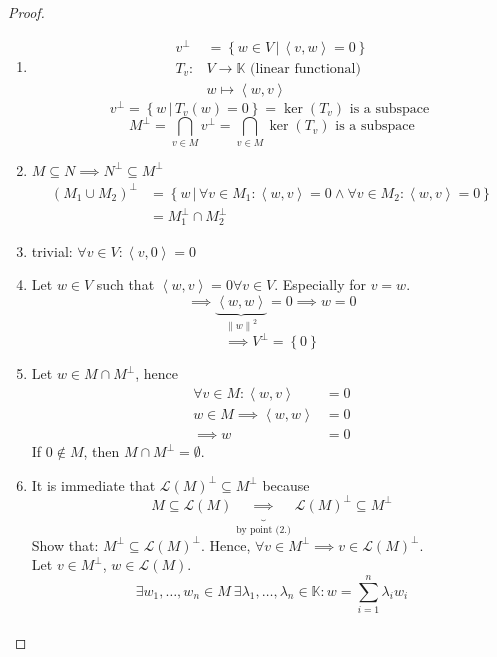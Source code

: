\documentclass[a4paper]{article}
\numberwithin{lecref}{section}
\newcommand{\set}[1]{\left\{#1\right\}}
\newcommand{\setdef}[2]{\left\{\left.#1\,\right|\,#2\right\}}
\newcommand{\ip}[2]{\left\langle#1,#2\right\rangle} %
\newcommand{\norm}[1]{\left\|#1\right\|}
\begin{document}
\begin{proof}
  \begin{enumerate}
    \item
      \begin{align*}
        v^\bot &= \setdef{w \in V}{\ip vw = 0} \\
          T_v: & V \to \mathbb K \text{ (linear functional)} \\
               & w \mapsto \ip wv
      \end{align*}
      \[ v^\bot = \setdef{w}{T_v(w) = 0} = \ker(T_v) \text{ is a subspace } \]
      \[ M^\bot = \bigcap_{v \in M} v^\bot = \bigcap_{v \in M} \ker(T_v) \text{ is a subspace} \]
    \item
      $M \subseteq N \implies N^\bot \subseteq M^\bot$
      \begin{align*}
        (M_1 \cup M_2)^\bot
          &= \setdef{w}{\forall v \in M_1: \ip wv = 0 \land \forall v \in M_2: \ip wv = 0} \\
          &= M_1^\bot \cap M_2^\bot
      \end{align*}
    \item trivial: $\forall v \in V: \ip v0 = 0$
    \item Let $w \in V$ such that $\ip wv = 0 \forall v \in V$. Especially for $v = w$.
      \[ \implies \underbrace{\ip ww}_{\norm{w}^2} = 0 \implies w = 0 \]
      \[ \implies V^\bot = \set{0} \]
    \item
      Let $w \in M \cap M^\bot$, hence
      \begin{align*}
        \forall v \in M: \ip wv &= 0 \\
        w \in M \implies \ip ww &= 0 \\
        \implies w &= 0
      \end{align*}
      If $0 \not\in M$, then $M \cap M^\bot = \emptyset$.
    \item It is immediate that $\mathcal L(M)^\bot \subseteq M^\bot$ because
      \[ M \subseteq \mathcal L(M) \underbrace{\implies}_{\text{by point (2.)}} \mathcal L(M)^\bot \subseteq M^\bot \]
      Show that: $M^\bot \subseteq \mathcal L(M)^\bot$.
      Hence, $\forall v \in M^\bot \implies v \in \mathcal L(M)^\bot$. \\
      Let $v \in M^\bot$, $w \in \mathcal L(M)$.
      \[
        \exists w_1, \ldots, w_n \in M \: \exists \lambda_1, \ldots, \lambda_n \in \mathbb K:
        w = \sum_{i=1}^n \lambda_i w_i
      \]
      \begin{align*}

\end{align*}
\end{enumerate}
\end{proof}
\end{document}
